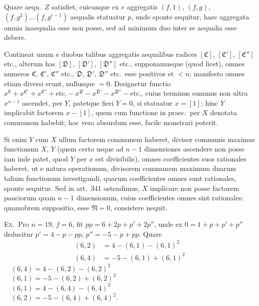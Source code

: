 \documentclass[12pt,a4paper]{article}
\theoremstyle{plain}
\theoremstyle{definition}
\theoremstyle{remark}
\begin{document}
Quare aequ.\ $Z$ satisfiet, cuicunque ex $e$ aggregatis $(f,1)$, $(f,g)$, $(f,g^2)\ldots(f,g^{e-1})$ aequalis statuatur $p$, unde sponte sequitur, haec aggregata omnia inaequalia esse non posse, sed ad minimum duo inter se aequalia esse debere.

Contineat unum e duobus talibus aggregatis aequalibus radices $[\mathfrak{C}]$, $[\mathfrak{C}']$, $[\mathfrak{C}'']$ etc., alterum has $[\mathfrak{D}]$, $[\mathfrak{D}']$, $[\mathfrak{D}'']$ etc., supponamusque (quod licet), omnes numeros $\mathfrak{C}$, $\mathfrak{C}'$, $\mathfrak{C}''$ etc., $\mathfrak{D}$, $\mathfrak{D}'$, $\mathfrak{D}''$ etc.\ esse positivos et $<n$; manifesto omnes etiam diversi erunt, nullusque $=0$. Designetur functio $x^{\mathfrak{C}}+x^{\mathfrak{C}'}+x^{\mathfrak{C}''}+\text{etc.}-x^{\mathfrak{D}}-x^{\mathfrak{D}'}-x^{\mathfrak{D}''}-\text{etc.}$, cuius terminus summus non ultra $x^{n-1}$ ascendet, per $Y$, patetque fieri $Y=0$, si statuatur $x=[1]$; hinc $Y$ implicabit factorem $x-[1]$, quem cum functione in praec.\ per $X$ denotata communem habebit; hoc vero absurdum esse, facile monstrari poterit.

Si enim $Y$ cum $X$ ullum factorem communem haberet, divisor communis maximus functionum $X$, $Y$ (quem certo usque ad $n-1$ dimensiones ascendere non posse iam inde patet, quod $Y$ per $x$ est divisibilis), omnes coefficientes suos rationales haberet, ut e natura operationum, divisorem communem maximum duarum talium functionum investigandi, quarum coefficientes omnes sunt rationales, sponte sequitur. Sed in art.\ 341 ostendimus, $X$ implicare non posse factorem pauciorum quam $n-1$ dimensionum, cuius coefficientes omnes sint rationales: quamobrem suppositio, esse $\mathfrak{N}=0$, consistere nequit.

\textsc{Ex.}\ Pro $n=19$, $f=6$, fit $pp=6+2p+p'+2p''$, unde ex $0=1+p+p'+p''$ deducitur $p'=4-p-pp$, $p''=-5-p+pp$. Quare
\begin{align*}
(6,2)&=4-(6,1)-(6,1)^2\\
(6,4)&=-5-(6,1)+(6,1)^2
\end{align*}
$\quad(6,4)=4-(6,2)-(6,2)^2$\\
$\quad(6,1)=-5-(6,2)+(6,2)^2$\\
$\quad(6,1)=4-(6,4)-(6,4)^2$\\
$\quad(6,2)=-5-(6,4)+(6,4)^2$.

\section{}
\end{document}
